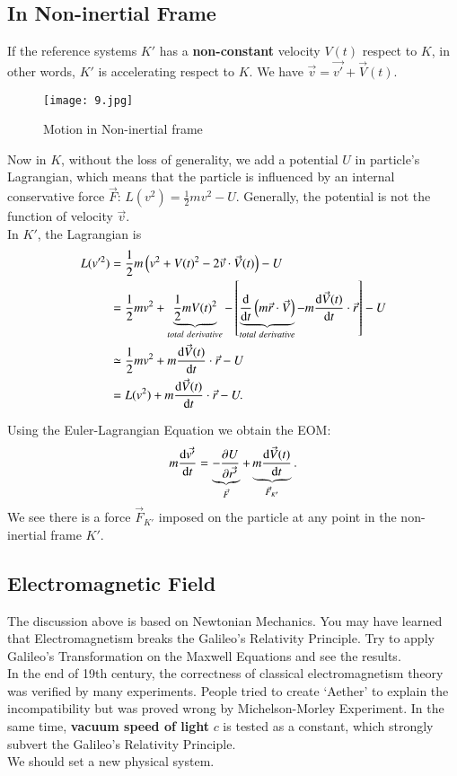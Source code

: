 \documentclass[openany,10pt]{book}
\theoremstyle{definition}
\theoremstyle{definition}
\theoremstyle{remark}
\begin{document}
\subsection{In Non-inertial Frame}\label{noniner}
 If the reference systems $K'$ has a {\bfseries non-constant} velocity $V(t)$ respect to $K$, in other words, $K'$ is accelerating respect to $K$. We have $\vec v=\vec {v'} + \vec V(t)$.
 
 \begin{figure}[htbp]
  \centering
    \texttt{[image: 9.jpg]}
 \caption{Motion in Non-inertial frame}
\end{figure}

 Now in $K$, without the loss of generality, we add a potential $U$ in particle's Lagrangian, which means that the particle is influenced by an internal conservative force $\vec F$: $L(v^2)=\frac12 mv^2-U$. Generally, the potential is not the function of velocity $\vec v$.\\
 In $K'$, the Lagrangian is  
 \begin{equation}
\begin{aligned}
L(v'^2)&=\frac12 m \left(v^2+V(t)^2-2\vec v\cdot \vec V(t)\right)-U\\
&=\frac12mv^2+\underbrace{\frac12mV(t)^2}_{total \ derivative}-\left[\underbrace{\frac{\rm d}{{\rm d}t}\left(m \vec r\cdot \vec V\right)}_{total \ derivative}-m\frac{{\rm d}\vec{V}(t)}{{\rm d}t}\cdot \vec r\right]-U\\
&\simeq \frac12mv^2+m\frac{{\rm d}\vec{V}(t)}{{\rm d}t}\cdot \vec r-U\\
&=L(v^2)+m\frac{{\rm d}\vec{V}(t)}{{\rm d}t}\cdot \vec r-U.
\end{aligned}
\end{equation}

Using the Euler-Lagrangian Equation we obtain the EOM:
\begin{equation}
    m\frac{{\rm d}\vec{v'}}{{\rm d}t}=\underbrace{-\frac{\partial U}{\partial \vec{r'}}}_{\vec F}+\underbrace{m\frac{{\rm d}\vec{V}(t)}{{\rm d}t}}_{\vec{F}_{K'}}.
\end{equation}
We see there is a force $\vec F_{K'}$ imposed on the particle at any point in the non-inertial frame $K'$.

\subsection{Electromagnetic Field}
The discussion above is based on Newtonian Mechanics. You may have learned that Electromagnetism breaks the Galileo’s Relativity Principle. Try to apply Galileo’s Transformation on the Maxwell Equations and see the results.\\
In the end of 19th century, the correctness of classical electromagnetism theory was verified by many experiments. People tried to create `Aether' to explain the incompatibility but was proved wrong by Michelson-Morley Experiment. In the same time, {\bfseries vacuum speed of light} $c$ is tested as a constant, which strongly subvert the Galileo’s Relativity Principle.\\
We should set a new physical system.
\end{document}
